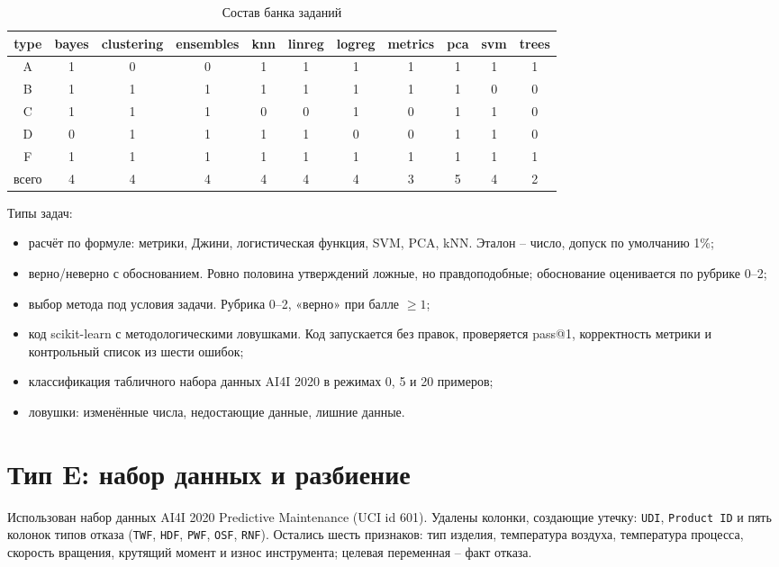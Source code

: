 \documentclass{bmstu}
\begin{document}
\begin{table}[H]
\centering
\caption{Состав банка заданий}
\label{tab:bank_type_topic}
\setlength{\tabcolsep}{3pt}
\begin{tabular}{|c|c|c|c|c|c|c|c|c|c|c|}
\hline
type & bayes & clustering & ensembles & knn & linreg & logreg & metrics & pca & svm & trees \\
\hline
A & 1 & 0 & 0 & 1 & 1 & 1 & 1 & 1 & 1 & 1 \\
B & 1 & 1 & 1 & 1 & 1 & 1 & 1 & 1 & 0 & 0 \\
C & 1 & 1 & 1 & 0 & 0 & 1 & 0 & 1 & 1 & 0 \\
D & 0 & 1 & 1 & 1 & 1 & 0 & 0 & 1 & 1 & 0 \\
F & 1 & 1 & 1 & 1 & 1 & 1 & 1 & 1 & 1 & 1  \\
\hline
всего & 4 & 4 & 4 & 4 & 4 & 4 & 3 & 5 & 4 & 2\\
\hline
\end{tabular}
\vspace{-10pt}
\end{table}


Типы задач:
\begin{itemize}[leftmargin=1.425\parindent, itemsep=0pt, topsep=-\parskip, wide=1.2cm]
\item расчёт по формуле: метрики, Джини, логистическая функция, SVM, PCA, kNN. Эталон -- число, допуск по умолчанию 1\%;
\item верно/неверно с обоснованием. Ровно половина утверждений ложные, но правдоподобные; обоснование оценивается по рубрике 0--2;
\item выбор метода под условия задачи. Рубрика 0--2, «верно» при балле $\ge1$;
\item код scikit-learn с методологическими ловушками. Код запускается без правок, проверяется pass@1, корректность метрики и контрольный список из шести ошибок;
\item классификация табличного набора данных AI4I 2020 в режимах 0, 5 и 20 примеров;
\item ловушки: изменённые числа, недостающие данные, лишние данные.
\end{itemize}

\section{Тип E: набор данных и разбиение}
Использован набор данных AI4I 2020 Predictive Maintenance (UCI id 601). Удалены колонки, создающие утечку: \texttt{UDI}, \texttt{Product ID} и пять колонок типов отказа (\texttt{TWF}, \texttt{HDF}, \texttt{PWF}, \texttt{OSF}, \texttt{RNF}). Остались шесть признаков: тип изделия, температура воздуха, температура процесса, скорость вращения, крутящий момент и износ инструмента; целевая переменная -- факт отказа.
\end{document}
